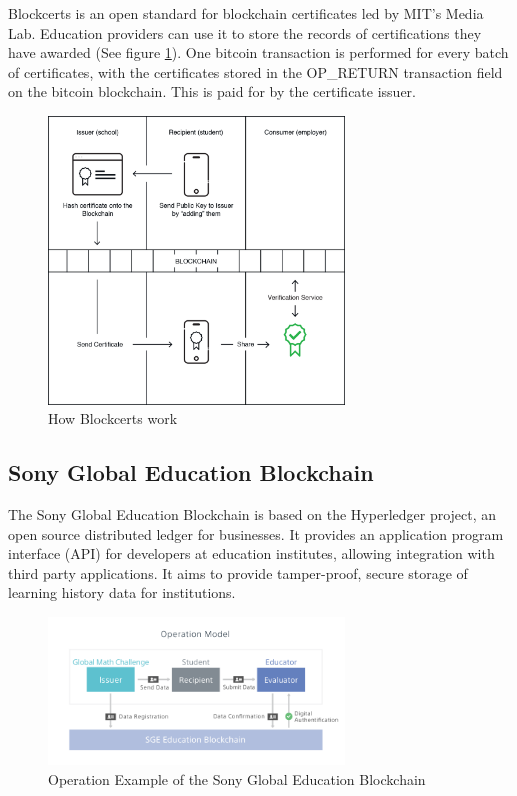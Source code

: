 Blockcerts is an open standard for blockchain certificates led by MIT’s Media Lab. Education providers can use it to store 
the records of certifications they have awarded (See figure \ref{fig:blockcerts}). One bitcoin transaction is performed for 
every batch of certificates, with the certificates stored in the OP\_RETURN transaction field on the bitcoin blockchain. 
This is paid for by the certificate issuer. \citep{blockcerts2018}

\begin{figure}[!h] 
    \centering    
    \includegraphics[width=0.7\textwidth]{blockcerts}
    \caption[How Blockcerts work]
        {How Blockcerts work \citep{blockcerts2018}}
    \label{fig:blockcerts}
\end{figure}

\subsection{Sony Global Education Blockchain}%

The Sony Global Education Blockchain is based on the Hyperledger project, an open source distributed ledger 
for businesses. It provides an application program interface (API) for developers at education institutes, 
allowing integration with third party applications. It aims to provide tamper-proof, secure storage of 
learning history data for institutions. \citep{sonyged2017}

\begin{figure}[!h] 
    \centering    
    \includegraphics[width=0.7\textwidth]{sonyged}
    \caption[Sony Global Education Blockchain]
        {Operation Example of the Sony Global Education Blockchain \citep{sonyged2017}}
    \label{fig:sonyged}
\end{figure}

